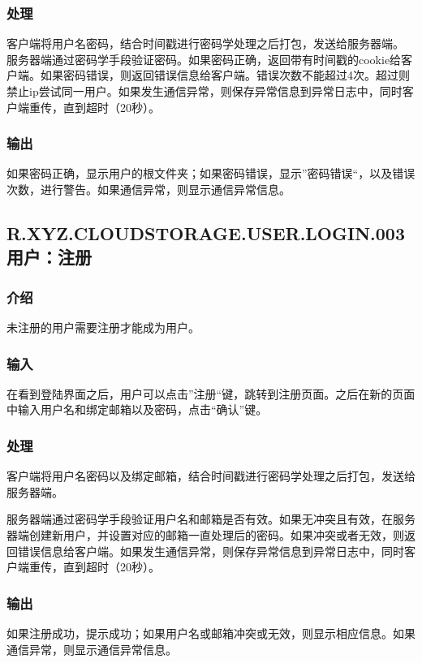 \subsubsection{处理}
客户端将用户名密码，结合时间戳进行密码学处理之后打包，发送给服务器端。
服务器端通过密码学手段验证密码。如果密码正确，返回带有时间戳的cookie给客户端。如果密码错误，则返回错误信息给客户端。错误次数不能超过4次。超过则禁止ip尝试同一用户。如果发生通信异常，则保存异常信息到异常日志中，同时客户端重传，直到超时（20秒）。

\subsubsection{输出}
如果密码正确，显示用户的根文件夹；如果密码错误，显示”密码错误“，以及错误次数，进行警告。如果通信异常，则显示通信异常信息。

\subsection{R.XYZ.CLOUDSTORAGE.USER.LOGIN.003 用户：注册 }

\subsubsection{介绍}
未注册的用户需要注册才能成为用户。

\subsubsection{输入}
在看到登陆界面之后，用户可以点击”注册“键，跳转到注册页面。之后在新的页面中输入用户名和绑定邮箱以及密码，点击“确认”键。

\subsubsection{处理}
客户端将用户名密码以及绑定邮箱，结合时间戳进行密码学处理之后打包，发送给服务器端。

服务器端通过密码学手段验证用户名和邮箱是否有效。如果无冲突且有效，在服务器端创建新用户，并设置对应的邮箱一直处理后的密码。如果冲突或者无效，则返回错误信息给客户端。如果发生通信异常，则保存异常信息到异常日志中，同时客户端重传，直到超时（20秒）。

\subsubsection{输出}
如果注册成功，提示成功；如果用户名或邮箱冲突或无效，则显示相应信息。如果通信异常，则显示通信异常信息。

